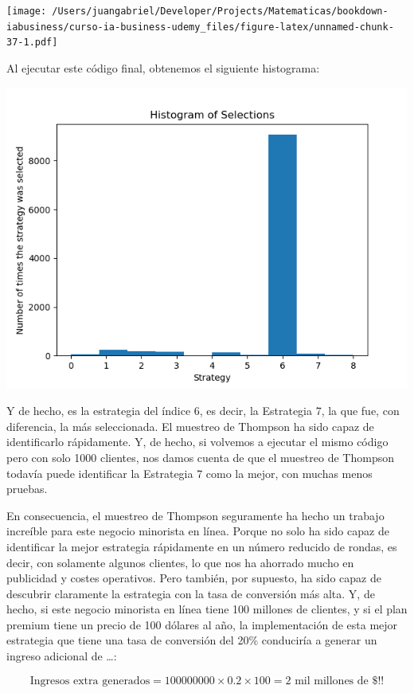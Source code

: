 \documentclass[]{book}
\begin{document}
\texttt{[image: /Users/juangabriel/Developer/Projects/Matematicas/bookdown-iabusiness/curso-ia-business-udemy\_files/figure-latex/unnamed-chunk-37-1.pdf]}

Al ejecutar este código final, obtenemos el siguiente histograma:

\includegraphics{Images/Histogram.png}

Y de hecho, es la estrategia del índice 6, es decir, la Estrategia 7, la que fue, con diferencia, la más seleccionada. El muestreo de Thompson ha sido capaz de identificarlo rápidamente. Y, de hecho, si volvemos a ejecutar el mismo código pero con solo 1000 clientes, nos damos cuenta de que el muestreo de Thompson todavía puede identificar la Estrategia 7 como la mejor, con muchas menos pruebas.

En consecuencia, el muestreo de Thompson seguramente ha hecho un trabajo increíble para este negocio minorista en línea. Porque no solo ha sido capaz de identificar la mejor estrategia rápidamente en un número reducido de rondas, es decir, con solamente algunos clientes, lo que nos ha ahorrado mucho en publicidad y costes operativos. Pero también, por supuesto, ha sido capaz de descubrir claramente la estrategia con la tasa de conversión más alta. Y, de hecho, si este negocio minorista en línea tiene 100 millones de clientes, y si el plan premium tiene un precio de 100 dólares al año, la implementación de esta mejor estrategia que tiene una tasa de conversión del 20\% conduciría a generar un ingreso adicional de \ldots{}:

\[\textrm{Ingresos extra generados} = 100000000 \times 0.2 \times 100 = \textrm{2 mil millones de }\$!!\]
\end{document}
